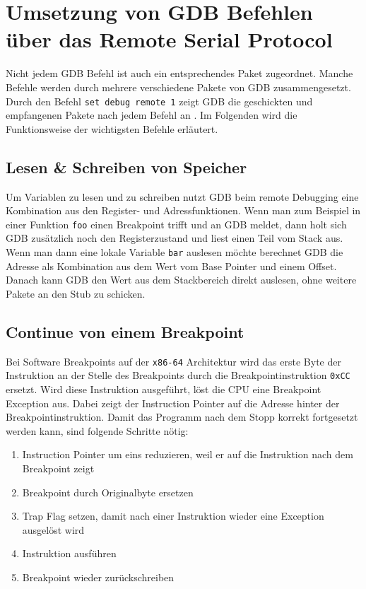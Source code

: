 \chapter{Umsetzung von GDB Befehlen über das Remote Serial Protocol}
Nicht jedem GDB Befehl ist auch ein entsprechendes Paket zugeordnet. Manche Befehle werden durch mehrere verschiedene Pakete von GDB zusammengesetzt. Durch den Befehl \texttt{set debug remote 1} zeigt GDB die geschickten und empfangenen Pakete nach jedem Befehl an \cite{gdb}. Im Folgenden wird die Funktionsweise der wichtigsten Befehle erläutert.

\section{Lesen \& Schreiben von Speicher}
Um Variablen zu lesen und zu schreiben nutzt GDB beim remote Debugging eine Kombination aus den Register- und Adressfunktionen. Wenn man zum Beispiel in einer Funktion \texttt{foo} einen Breakpoint trifft und an GDB meldet, dann holt sich GDB zusätzlich noch den Registerzustand und liest einen Teil vom Stack aus. Wenn man dann eine lokale Variable \texttt{bar} auslesen möchte berechnet GDB die Adresse als Kombination aus dem Wert vom Base Pointer und einem Offset. Danach kann GDB den Wert aus dem Stackbereich direkt auslesen, ohne weitere Pakete an den Stub zu schicken.

\section{Continue von einem Breakpoint}
Bei Software Breakpoints auf der \texttt{x86-64} Architektur wird das erste Byte der Instruktion an der Stelle des Breakpoints durch die Breakpointinstruktion \texttt{0xCC} ersetzt. Wird diese Instruktion ausgeführt, löst die CPU eine Breakpoint Exception aus. Dabei zeigt der Instruction Pointer auf die Adresse hinter der Breakpointinstruktion. Damit das Programm nach dem Stopp korrekt fortgesetzt werden kann, sind folgende Schritte nötig:

\begin{enumerate}[]
\item Instruction Pointer um eins reduzieren, weil er auf die Instruktion nach dem Breakpoint zeigt
\item Breakpoint durch Originalbyte ersetzen
\item Trap Flag setzen, damit nach einer Instruktion wieder eine Exception ausgelöst wird
\item Instruktion ausführen
\item Breakpoint wieder zurückschreiben
\end{enumerate}

